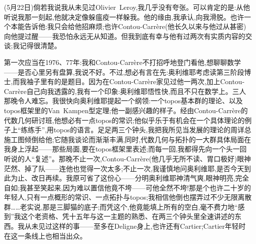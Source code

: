 
(5月22日)倘若我说我从未见过Olivier~Leroy,我几乎没有夸张。可以肯定的是:从他听说我那一刻起,他就决定像躲瘟疫一样躲我。他的缘由,我承认,向我滑脱。也许一个本能告诉他:我只会给他招麻烦;也许Contou-Carrère(他长久以来与他过从甚密)向他提过醒——我恐怕永远无从知道。但我到底有幸与他有过两次有实质内容的交谈;我记得很清楚。

第一次应当在1976、77年:我和Contou-Carrère不打招呼地登门看他,想聊聊数学——是否心里另有盘算,我说不好。不过,想必有言在先:奥利维耶考虑读第三阶段博士,而我袖子里有的是题目。因为在Contou-Carrère家见过他一两次,加上Contou-Carrère自己向我透露的,我有一个印象:奥利维耶悟性快,而且不只在数学上。三人那晚令人难忘。我很快向奥利维耶提起一个纲领:一个topos基本群的理论、以及topos框架里的Van~Kampen型定理;他一副感兴趣的样子。经由Contou-Carrère的代数几何研讨班,他想必有一点topos的常识;他似乎乐于有机会在一个具体理论的例子上“练练手”,用topos的语言。足足两三个钟头,我把我所见当发展的理论的周详总施工图倾倒给他;它随我谈论而渐渐丰满,同时,代数几何与拓扑的一大群具体局面在我身上浮起——那些局面,要在topos框架里表述;而每一回,我都得先向一个头一回听说的人“复述”\dmark{}。那晚不止一次,Contou-Carrère(他几乎无所不读、胃口极好)眼神茫然、掉了队——连他也觉得一次太多;不止一次,我谨慎地问奥利维耶,是否今天到此为止、改日再续。我原可省了这份心——分明奥利维耶神清气爽,眼神明亮,完全自如;我甚至笑起来,因为难以置信他竟不垮——可他全然不垮!那是个也许二十岁的年轻人,只有一点概形的常识、一点拓扑与topos;我相信他倒也摆弄过不少无限离散群……老实说,那是三脚猫的底子;而凭这个,他竟能填上所有的空白,毫不费力地“感到”我这个老资格、凭十五年与这一主题的熟悉、在两三个钟头里全速讲述的东西。我从未见过这样的事——至多在Deligne身上,也许还有Cartier;Cartier年轻时在这一条线上也相当出众。

